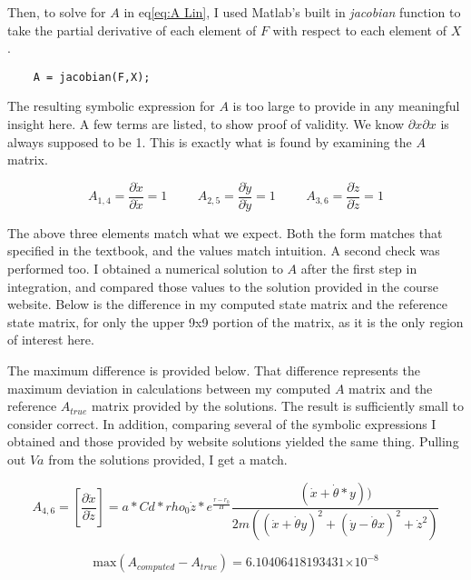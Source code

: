\documentclass[12pt,a4paper,oneside]{article}
\numberwithin{equation}{section}   		%
\providecommand{\e}[1]{\ensuremath{\times 10^{#1}}}
\begin{document}
Then, to solve for $A$ in eq\eqref{eq:A Lin}, I used Matlab's built in \emph{jacobian} function to take the partial derivative of each element of $F$ with respect to each element of $X$.

\begin{lstlisting}
	A = jacobian(F,X);
\end{lstlisting}

The resulting symbolic expression for $A$ is too large to provide in any meaningful insight here. A few terms are listed, to show proof of validity. We know $\partial{x}\partial{x}$ is always supposed to be 1. This is exactly what is found by examining the $A$ matrix. 

\begin{displaymath}
	A_{1,4} = \frac{\partial \dot{x}}{\partial \dot{x}} = 1	\hspace{1cm}
	A_{2,5} = \frac{\partial \dot{y}}{\partial \dot{y}} = 1	\hspace{1cm}
	A_{3,6} = \frac{\partial \dot{z}}{\partial \dot{z}} = 1	
\end{displaymath}

The above three elements match what we expect. Both the form matches that specified in the textbook, and the values match intuition. A second check was performed too. I obtained a numerical solution to $A$ after the first step in integration, and compared those values to the solution provided in the course website. Below is the difference in my computed state matrix and the reference state matrix, for only the upper 9x9 portion of the matrix, as it is the only region of interest here. 

The maximum difference is provided below. That difference represents the maximum deviation in calculations between my computed $A$ matrix and the reference $A_{true}$ matrix provided by the solutions. The result is sufficiently small to consider correct. In addition, comparing several of the symbolic expressions I obtained and those provided by website solutions yielded the same thing. Pulling out $Va$ from the solutions provided, I get a match. 


\begin{equation}
	A_{4,6}=\left[\frac{\partial{\ddot{x}}}{\partial{\dot{z}}} \right]
	= a*Cd*rho_0\dot{z}*e^{\frac{r - r_0}{H}}\frac{(\dot{x} + \dot{\theta}*y))}{2m((\dot{x} + \dot{\theta}y)^2 + (\dot{y} - \dot{\theta}x)^2 + \dot{z}^2)}
	\label{eq:Symbolic A}
\end{equation}

\begin{equation}
		\text{max}(A_{computed} - A_{true}) = 6.10406418193431\e{-8}
		\label{eq:MaxADiff}
\end{equation}
\end{document}
